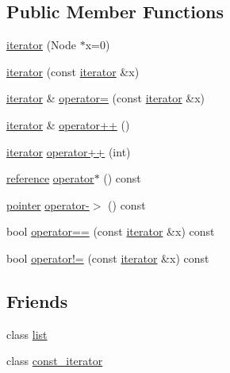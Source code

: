 \subsection*{Public Member Functions}
\begin{DoxyCompactItemize}
\item 
\hyperlink{classlist_1_1iterator_aed6d36c5154555d309acb69c1cc0b5db}{iterator} (Node $\ast$x=0)
\item 
\hyperlink{classlist_1_1iterator_ab3e5d6ca4d611f3a188d36a7df41df18}{iterator} (const \hyperlink{classlist_1_1iterator}{iterator} \&x)
\item 
\hyperlink{classlist_1_1iterator}{iterator} \& \hyperlink{classlist_1_1iterator_a04b0adf36bbb2c958040e5a505be6393}{operator=} (const \hyperlink{classlist_1_1iterator}{iterator} \&x)
\item 
\hyperlink{classlist_1_1iterator}{iterator} \& \hyperlink{classlist_1_1iterator_ac1a52b81e6857a2f766cad8ae9b7e3ef}{operator++} ()
\item 
\hyperlink{classlist_1_1iterator}{iterator} \hyperlink{classlist_1_1iterator_a54581e2941db9fcf50e2553fe6e70140}{operator++} (int)
\item 
\hyperlink{classlist_1_1iterator_a67117308303156c5b6419ad9439d2376}{reference} \hyperlink{classlist_1_1iterator_aef3344fdc48292642e8e869fcea51297}{operator$\ast$} () const 
\item 
\hyperlink{classlist_1_1iterator_ac23aff59f93df3d2faf295726c1d2bba}{pointer} \hyperlink{classlist_1_1iterator_a3aa011f80d0fd23ff23930b5a872755a}{operator-\/$>$} () const 
\item 
bool \hyperlink{classlist_1_1iterator_a5be3a6de9428364e874fcbd861d0ed6c}{operator==} (const \hyperlink{classlist_1_1iterator}{iterator} \&x) const 
\item 
bool \hyperlink{classlist_1_1iterator_a9874b68c0518c6261a8e6d7b6f5e1992}{operator!=} (const \hyperlink{classlist_1_1iterator}{iterator} \&x) const 
\end{DoxyCompactItemize}
\subsection*{Friends}
\begin{DoxyCompactItemize}
\item 
class \hyperlink{classlist_1_1iterator_a39e8296e3b93358d0af90000b5d9113c}{list}
\item 
class \hyperlink{classlist_1_1iterator_ac220ce1c155db1ac44146c12d178056f}{const\_\-iterator}
\end{DoxyCompactItemize}


